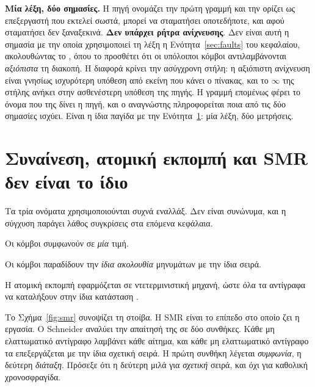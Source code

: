 \begin{table}[t]
\begin{minipage}{0.94\linewidth}
\smallskip
\textbf{Μία λέξη, δύο σημασίες.} Η πηγή ονομάζει την πρώτη γραμμή
\emph{} και την ορίζει ως επεξεργαστή που εκτελεί σωστά,
μπορεί να σταματήσει οποτεδήποτε, και αφού σταματήσει δεν ξαναξεκινά.
\textbf{Δεν υπάρχει ρήτρα ανίχνευσης}. Δεν είναι αυτή η σημασία με την
οποία χρησιμοποιεί τη λέξη η Ενότητα~\ref{sec:faults} του κεφαλαίου,
ακολουθώντας το \cite{schneider1990implementing}, όπου το
 προσθέτει ότι οι υπόλοιποι κόμβοι αντιλαμβάνονται
\emph{αξιόπιστα} τη διακοπή. Η διαφορά κρίνει την ασύγχρονη στήλη: η
αξιόπιστη ανίχνευση είναι γνησίως ισχυρότερη υπόθεση από εκείνη που
κάνει ο πίνακας, και το $\infty$ της στήλης ανήκει στην ασθενέστερη
υπόθεση της πηγής. Η γραμμή επομένως φέρει το όνομα που της δίνει η
πηγή, και ο αναγνώστης πληροφορείται ποια από τις δύο σημασίες ισχύει.
Είναι η ίδια παγίδα με την Ενότητα~\ref{sec:smr}: μία λέξη, δύο
μετρήσεις.
\end{minipage}
\end{table}

\section{Συναίνεση, ατομική εκπομπή και SMR δεν είναι το ίδιο}
\label{sec:smr}

Τα τρία ονόματα χρησιμοποιούνται συχνά εναλλάξ. Δεν είναι συνώνυμα, και
η σύγχυση παράγει λάθος συγκρίσεις στα επόμενα κεφάλαια.

\begin{description}[leftmargin=2.2em,style=nextline,font=\normalfont\bfseries]
  \item[Συναίνεση (\en{consensus}).] Οι κόμβοι συμφωνούν σε \emph{μία}
  τιμή.
  \item[Ατομική εκπομπή (\en{atomic broadcast}).] Οι κόμβοι παραδίδουν
  την \emph{ίδια ακολουθία} μηνυμάτων με την ίδια σειρά.
  \item[Αναπαραγωγή μηχανής καταστάσεων (SMR).] Η ατομική εκπομπή
  εφαρμόζεται σε ντετερμινιστική μηχανή, ώστε όλα τα αντίγραφα να
  καταλήξουν στην ίδια κατάσταση \cite{schneider1990implementing}.
\end{description}

Το Σχήμα~\ref{fig:smr} συνοψίζει τη στοίβα. Η SMR είναι το επίπεδο στο
οποίο ζει η εργασία. Ο Schneider αναλύει την απαίτησή της σε δύο
συνθήκες. Κάθε μη ελαττωματικό αντίγραφο λαμβάνει κάθε αίτημα, και κάθε
μη ελαττωματικό αντίγραφο τα επεξεργάζεται με την ίδια σχετική σειρά. Η
πρώτη συνθήκη λέγεται \emph{συμφωνία}, η δεύτερη \emph{διάταξη}.
Πρόσεξε ότι η δεύτερη μιλά για \emph{σχετική} σειρά, και όχι για
καθολική χρονοσφραγίδα.

